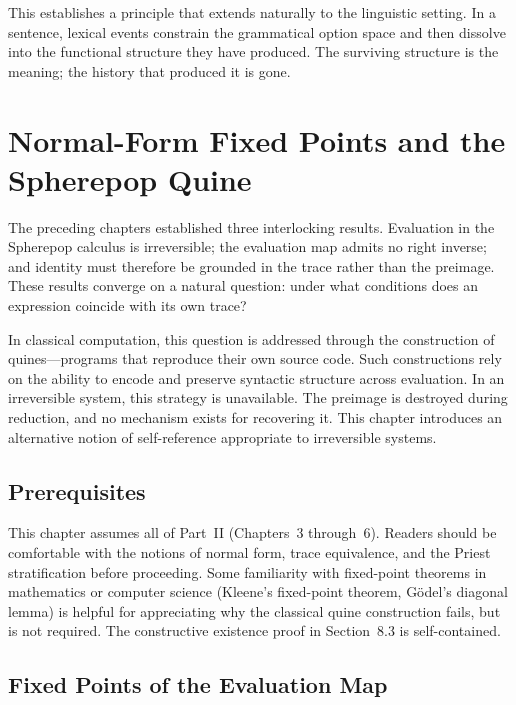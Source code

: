 \documentclass[12pt, oneside]{amsbook}
\theoremstyle{plain}
\theoremstyle{definition}
\theoremstyle{remark}
\begin{document}
This establishes a principle that extends naturally to the linguistic setting.
In a sentence, lexical events constrain the grammatical option space and then
dissolve into the functional structure they have produced. The surviving
structure is the meaning; the history that produced it is gone.

\chapter{Normal-Form Fixed Points and the Spherepop Quine}
\label{ch:fixedpoints}

The preceding chapters established three interlocking results. Evaluation in
the Spherepop calculus is irreversible; the evaluation map admits no right
inverse; and identity must therefore be grounded in the trace rather than the
preimage. These results converge on a natural question: under what conditions
does an expression coincide with its own trace?

In classical computation, this question is addressed through the construction
of quines---programs that reproduce their own source code. Such constructions
rely on the ability to encode and preserve syntactic structure across evaluation.
In an irreversible system, this strategy is unavailable. The preimage is
destroyed during reduction, and no mechanism exists for recovering it. This
chapter introduces an alternative notion of self-reference appropriate to
irreversible systems.

\section{Prerequisites}

This chapter assumes all of Part~II (Chapters~3 through~6). Readers should be comfortable with the notions of normal form, trace equivalence, and the Priest stratification before proceeding. Some familiarity with fixed-point theorems in mathematics or computer science (Kleene's fixed-point theorem, G\"odel's diagonal lemma) is helpful for appreciating why the classical quine construction fails, but is not required. The constructive existence proof in Section~8.3 is self-contained.

\section{Fixed Points of the Evaluation Map}
\label{sec:fixedpoints:defn}
\end{document}
